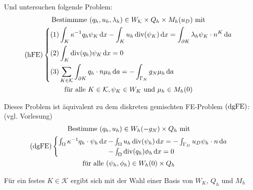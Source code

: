 Und untersuchen folgende Problem:
\begin{gather*}
	\text{Bestimmme } (q_h,u_h, \lambda_h) \in W_\mathcal{K} \times Q_h \times M_h(u_D) \text{ mit}\\
	\operatorname{(hFE)}\begin{dcases}
		(1) \int_K \kappa^{-1} q_h \psi_K \mathop{}\!\mathrm{d} x - \int_K u_h \operatorname{div}(\psi_K) \mathop{}\!\mathrm{d} x = \int_{\partial K} \lambda_h \psi_K \cdot n^K \mathop{}\!\mathrm{d} a \\
		(2) \int_K \operatorname{div}(q_h) \psi_K \mathop{}\!\mathrm{d} x = 0\\
		(3) \sum_{K\in \mathcal{K}} \int_{\partial K} q_h \cdot n \mu_h \mathop{}\!\mathrm{d} a = - \int_{\Gamma_N} g_N \mu_h \mathop{}\!\mathrm{d} a
	\end{dcases}\\
	\text{für alle } K \in \mathcal{K}, \psi_K \in W_K  \text{ und } \mu_h \in M_h(0)
\end{gather*}

Dieses Problem ist äquivalent zu dem diskreten gemischten FE-Problem $ \operatorname{(dgFE)} $: (vgl. Vorlesung)
\begin{gather*}
\text{Bestimme } (q_h,u_h) \in W_h(-g_N) \times Q_h \text{ mit}\\
\operatorname{(dgFE)}\begin{cases}
\int_{\Omega} \kappa ^{-1} q_h \cdot \psi_h \mathop{}\!\mathrm{d} x \mkern-15mu &- \int_{\Omega} u_h \operatorname{div}(\psi_h) \mathop{}\!\mathrm{d} x = - \int_{\Gamma_D} u_D \psi_h \cdot n \mathop{}\!\mathrm{d} a\\
&- \int_{\Omega} \operatorname{div}(q_h) \phi_h \mathop{}\!\mathrm{d} x = 0
\end{cases} \\
\text{für alle } (\psi_h, \phi_h) \in W_h(0) \times Q_h
\end{gather*}

Für ein festes $ K \in \mathcal{K} $ ergibt sich mit der Wahl einer Basis von $ W_K $, $ Q_h $ und $ M_h $ 
 
